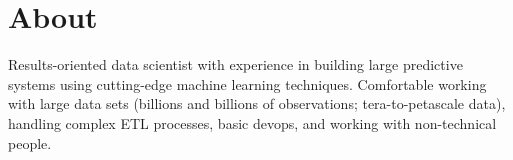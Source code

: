 \documentclass[print]{friggeri-cv} %
\begin{document}
\section{About}
Results-oriented data scientist with experience in building large predictive
systems using cutting-edge machine learning techniques. Comfortable working
with large data sets (billions and billions of observations; tera-to-petascale
data), handling complex ETL processes, basic devops, and working with
non-technical people.

\iftoggle{cv}
{\section{Research/Work Experience}
}
{\section{Selected Experience}
}
\end{document}
